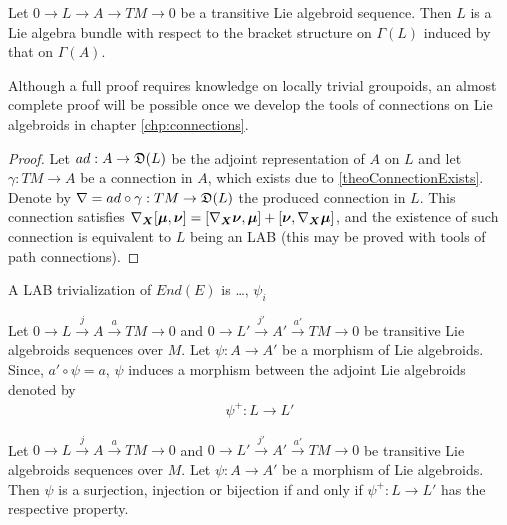 \begin{theorem}\label{theoAdjointLAB} %
Let $0 \to L \to A \to  TM \to 0$ be a transitive Lie algebroid sequence. Then $L$ is a Lie algebra bundle with respect to the bracket structure on $\Gamma(L)$ induced by that on $\Gamma(A)$.
\end{theorem}
Although a full proof requires knowledge on locally trivial groupoids, an almost complete proof will be possible once we develop the tools of connections on Lie algebroids in chapter \ref{chp:connections}. 
\begin{proof}
Let $ad: A \to \mathfrak{D}(L)$ be the adjoint representation of $A$ on $L$ and let $\gamma: TM \to A$ be a connection in $A$, which exists due to \ref{theoConnectionExists}. Denote by $\nabla = ad \circ \gamma : TM \to \mathfrak{D}(L)$ the produced connection in $L$. This connection satisfies $\nabla_{\bm{X}}[\bm{\mu}, \bm{\nu}] = [\nabla_{\bm{X}} \bm{\nu}, \bm{\mu}] + [\bm{\nu}, \nabla_{\bm{X}} \bm{\mu}]$, and the existence of such connection is equivalent to $L$ being an LAB (this may be proved with tools of path connections).
\end{proof}

\begin{example}
A LAB trivialization of $End(E)$ is \dots, $\psi_i$
\end{example}

\begin{definition}\label{defnPhi+}
Let $0 \to L \xrightarrow{j} A \xrightarrow{a} TM \to 0$ and $0 \to L' \xrightarrow{j'} A' \xrightarrow{a'} TM \to 0$ be transitive Lie algebroids sequences over $M$. Let $\psi: A \to A'$ be a morphism of Lie algebroids. Since, $a' \circ \psi = a$, $\psi$ induces a morphism between the adjoint Lie algebroids denoted by
\begin{align*}
    \psi^+: L \to L'
\end{align*}
\end{definition}

\begin{proposition}
Let $0 \to L \xrightarrow{j} A \xrightarrow{a} TM \to 0$ and $0 \to L' \xrightarrow{j'} A' \xrightarrow{a'} TM \to 0$ be transitive Lie algebroids sequences over $M$. Let $\psi: A \to A'$ be a morphism of Lie algebroids. Then $\psi$ is a surjection, injection or bijection if and only if $\psi^+: L \to L'$ has the respective property.
\end{proposition}

